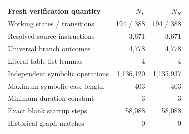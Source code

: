 \begin{center}
\begin{tabular}{@{}lrr@{}}
\toprule Fresh verification quantity & $N_L$ & $N_R$\\\midrule
Working states / transitions &194 / 388&194 / 388\\
Resolved source instructions &3,671&3,671\\
Universal branch outcomes &4,778&4,778\\
Literal-table list lemmas &4&4\\
Independent symbolic operations &1,136,120&1,135,937\\
Maximum symbolic case length &403&403\\
Minimum duration constant &3&3\\
Exact blank startup steps &58,088&58,088\\
Historical graph matches &0&0\\
\bottomrule
\end{tabular}
\end{center}
